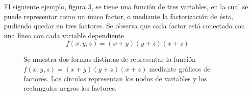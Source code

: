 \documentclass[11pt,twoside,spanish]{report} %
\begin{document}
El siguiente ejemplo, figura \ref{graph:FGej1}, se tiene una funci\'on de tres variables, en la cual se puede representar como un \'unico factor, o mediante la factorizaci\'on de \'esta, pudiendo quedar en tres factores. 
Se observa que cada factor est\'a conectado con una l\'inea con cada variable dependiente.
	\begin{equation*}
	f(x,y,z) = (x+y)(y+z)(x+z)
	\end{equation*}
\begin{center}

	\begin{figure}[H]
		\centering
		\begin{subfigure}{.5\textwidth}
			\centering
			\caption{}
			\label{graph:FGej1-1}
		\end{subfigure}%
		\begin{subfigure}{.5\textwidth}
			\centering
			\caption{}
			\label{graph:FGej1-2}
		\end{subfigure}
		\caption{Se muestra dos formas distintas de representar la funci\'on $f(x,y,z) = (x+y)(y+z)(x+z)$ mediante gr\'aficos de factores. Los c\'irculos representan los nodos de variables y los rectangulos negros los factores.}
		\label{graph:FGej1}
	\end{figure}
\end{center}
\end{document}

